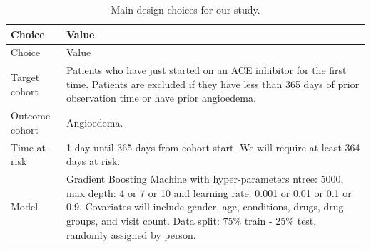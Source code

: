 \documentclass[11pt]{book}
\theoremstyle{definition}
\theoremstyle{definition}
\theoremstyle{definition}
\theoremstyle{remark}
\begin{document}
\begin{longtable}[]{@{}ll@{}}
\caption{\label{tab:plpSummary} Main design choices for our
study.}\tabularnewline
\toprule
\begin{minipage}[b]{0.23\columnwidth}\raggedright\strut
Choice\strut
\end{minipage} & \begin{minipage}[b]{0.71\columnwidth}\raggedright\strut
Value\strut
\end{minipage}\tabularnewline
\midrule
\endfirsthead
\toprule
\begin{minipage}[b]{0.23\columnwidth}\raggedright\strut
Choice\strut
\end{minipage} & \begin{minipage}[b]{0.71\columnwidth}\raggedright\strut
Value\strut
\end{minipage}\tabularnewline
\midrule
\endhead
\begin{minipage}[t]{0.23\columnwidth}\raggedright\strut
Target cohort\strut
\end{minipage} & \begin{minipage}[t]{0.71\columnwidth}\raggedright\strut
Patients who have just started on an ACE inhibitor for the first time.
Patients are excluded if they have less than 365 days of prior
observation time or have prior angioedema.\strut
\end{minipage}\tabularnewline
\begin{minipage}[t]{0.23\columnwidth}\raggedright\strut
Outcome cohort\strut
\end{minipage} & \begin{minipage}[t]{0.71\columnwidth}\raggedright\strut
Angioedema.\strut
\end{minipage}\tabularnewline
\begin{minipage}[t]{0.23\columnwidth}\raggedright\strut
Time-at-risk\strut
\end{minipage} & \begin{minipage}[t]{0.71\columnwidth}\raggedright\strut
1 day until 365 days from cohort start. We will require at least 364
days at risk.\strut
\end{minipage}\tabularnewline
\begin{minipage}[t]{0.23\columnwidth}\raggedright\strut
Model\strut
\end{minipage} & \begin{minipage}[t]{0.71\columnwidth}\raggedright\strut
Gradient Boosting Machine with hyper-parameters ntree: 5000, max depth:
4 or 7 or 10 and learning rate: 0.001 or 0.01 or 0.1 or 0.9. Covariates
will include gender, age, conditions, drugs, drug groups, and visit
count. Data split: 75\% train - 25\% test, randomly assigned by
person.\strut
\end{minipage}\tabularnewline
\bottomrule
\end{longtable}
\end{document}
